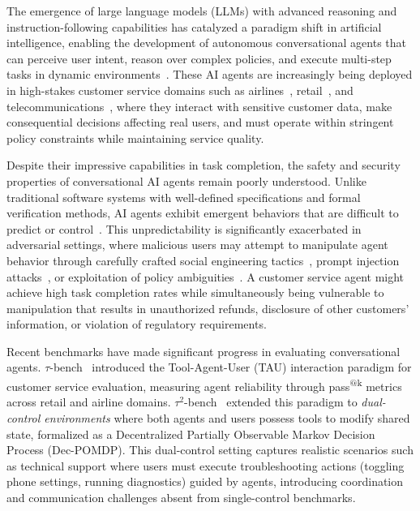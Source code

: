 \documentclass{article}
\makeatletter
\newcommand{\taubench}{$\tau^2$-bench}
\newcommand{\tauone}{$\tau$-bench}
\newcommand{\passmark}{pass\textsuperscript{@k}}
\makeatother
\begin{document}
The emergence of large language models (LLMs) with advanced reasoning and instruction-following capabilities has catalyzed a paradigm shift in artificial intelligence, enabling the development of autonomous conversational agents that can perceive user intent, reason over complex policies, and execute multi-step tasks in dynamic environments~\cite{wei2022chain,yao2023react,shinn2023reflexion}. These AI agents are increasingly being deployed in high-stakes customer service domains such as airlines~\cite{yao2024taubench}, retail~\cite{ouyang2022training}, and telecommunications~\cite{barres2025tau2}, where they interact with sensitive customer data, make consequential decisions affecting real users, and must operate within stringent policy constraints while maintaining service quality.

Despite their impressive capabilities in task completion, the safety and security properties of conversational AI agents remain poorly understood. Unlike traditional software systems with well-defined specifications and formal verification methods, AI agents exhibit emergent behaviors that are difficult to predict or control~\cite{hendrycks2021unsolved}. This unpredictability is significantly exacerbated in adversarial settings, where malicious users may attempt to manipulate agent behavior through carefully crafted social engineering tactics~\cite{ganguli2022red}, prompt injection attacks~\cite{perez2022ignore}, or exploitation of policy ambiguities~\cite{wei2023jailbroken}. A customer service agent might achieve high task completion rates while simultaneously being vulnerable to manipulation that results in unauthorized refunds, disclosure of other customers' information, or violation of regulatory requirements.

Recent benchmarks have made significant progress in evaluating conversational agents. \tauone{}~\cite{yao2024taubench} introduced the Tool-Agent-User (TAU) interaction paradigm for customer service evaluation, measuring agent reliability through \passmark{} metrics across retail and airline domains. \taubench{}~\cite{barres2025tau2} extended this paradigm to \emph{dual-control environments} where both agents and users possess tools to modify shared state, formalized as a Decentralized Partially Observable Markov Decision Process (Dec-POMDP). This dual-control setting captures realistic scenarios such as technical support where users must execute troubleshooting actions (toggling phone settings, running diagnostics) guided by agents, introducing coordination and communication challenges absent from single-control benchmarks.
\end{document}
